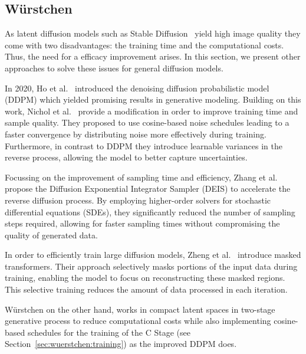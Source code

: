 \subsection{W\"urstchen}
As latent diffusion models such as Stable
Diffusion~\cite{rombach2022stablediffusion} yield high image quality they come
with two disadvantages: the training time and the computational costs. Thus,
the need for a efficacy improvement arises. In this section, we present other
approaches to solve these issues for general diffusion models.

In 2020, Ho et al.~\cite{ho2020denoisingdiffusionprobabilisticmodels} introduced
the  denoising diffusion probabilistic model (DDPM) which yielded promising
results in generative modeling. Building on this work, Nichol et
al.~\cite{Nichol2021ImprovedDenoisingDiffusionProbabilisticModels} provide a
modification in order to improve training time and sample quality. They
proposed to use cosine-based noise schedules leading to a faster
convergence by distributing noise more effectively during training.
Furthermore, in contrast to DDPM they introduce learnable variances in the
reverse process, allowing the model to better capture uncertainties.

Focussing on the improvement of sampling time and efficiency,
Zhang et al.~\cite{zhang2023fastsamplingdiffusionmodels} propose the
Diffusion Exponential Integrator Sampler (DEIS) to accelerate the reverse
diffusion process. By employing higher-order solvers for stochastic
differential equations (SDEs), they significantly reduced the number of
sampling steps required, allowing for faster sampling times without
compromising the quality of generated data.

In order to efficiently train large diffusion models, Zheng et
al.~\cite{zheng2024fast} introduce masked transformers. Their approach
selectively masks portions of the input data during training, enabling the
model to focus on reconstructing these masked regions. This selective training
reduces the amount of data processed in each iteration.

W\"urstchen on the other hand, works in compact latent spaces in two-stage
generative process to reduce computational costs while also implementing
cosine-based schedules for the training of the C Stage (see
Section~\ref{sec:wuerstchen:training}) as the improved DDPM does.